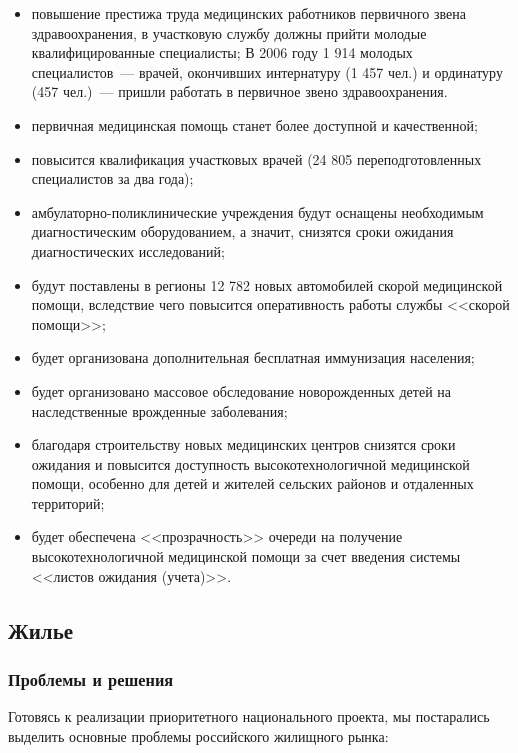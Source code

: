 \documentclass[article, 12pt, russian, oneside]{ncc}
\begin{document}
\begin{itemize}
\item повышение престижа труда медицинских работников первичного звена
  здравоохранения, в участковую службу должны прийти молодые
  квалифицированные специалисты; В 2006 году 1 914 молодых
  специалистов~--- врачей, окончивших интернатуру (1 457 чел.) и
  ординатуру (457 чел.)~--- пришли работать в первичное звено
  здравоохранения.
\item первичная медицинская помощь станет более доступной и
  качественной;
\item повысится квалификация участковых врачей (24 805
  переподготовленных специалистов за два года);
\item амбулаторно-поликлинические учреждения будут оснащены
  необходимым диагностическим оборудованием, а значит, снизятся сроки
  ожидания диагностических исследований;
\item будут поставлены в регионы 12 782 новых автомобилей скорой
  медицинской помощи, вследствие чего повысится оперативность работы
  службы <<скорой помощи>>;
\item будет организована дополнительная бесплатная иммунизация
  населения;
\item будет организовано массовое обследование новорожденных детей на
  наследственные врожденные заболевания;
\item благодаря строительству новых медицинских центров снизятся сроки
  ожидания и повысится доступность высокотехнологичной медицинской
  помощи, особенно для детей и жителей сельских районов и отдаленных
  территорий;
\item будет обеспечена <<прозрачность>> очереди на получение
  высокотехнологичной медицинской помощи за счет введения системы
  <<листов ожидания (учета)>>.
\end{itemize}

\subsection{Жилье}

\subsubsection{Проблемы и решения}

Готовясь к реализации приоритетного национального проекта, мы
постарались выделить основные проблемы российского жилищного рынка:
\end{document}
